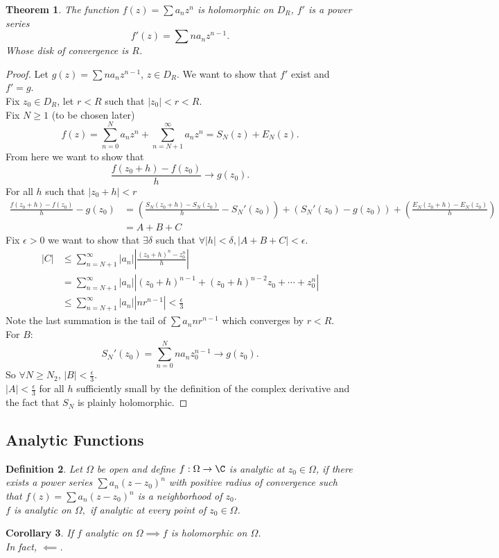 \documentclass[a4paper]{article}
\newtheorem{thm}{Theorem}[section]
\newtheorem{defn}[thm]{Definition}
\newtheorem{cor}[thm]{Corollary}
\begin{document}
\begin{thm}
    The function $f(z)=\sum a_nz^n$ is holomorphic on $D_R$, $f'$ is a power series 
    \[
    f'(z)=\sum na_nz^{n-1}
    .\] 
    Whose disk of convergence is $R$. 
\end{thm}
\begin{proof}
    Let $g(z)=\sum na_nz^{n-1}$, $z\in D_R$. We want to show that $f'$ exist and $f'=g$.\\
    Fix $z_0\in D_R$, let $r<R$ such that $|z_0|<r<R$.\\
    Fix $N\geq 1$ (to be chosen later)\\
    \[
    f(z)=\sum_{n=0}^{N} a_nz^n+\sum_{n=N+1}^\infty a_nz^n=S_N(z)+E_N(z)
    .\] 
    From here we want to show that \[
    \frac{f(z_0+h)-f(z_0)}{h}\to g(z_0)
    .\] 
    For all $h$ such that $|z_0+h|<r$
    \begin{align*}
            \frac{f(z_0+h)-f(z_0)}{h}-g(z_0)&= \left ( \frac{S_N(z_0+h)-S_N(z_0)}{h}-S_N'(z_0)\right ) + \left( S_N'(z_0)-g(z_0) \right) + \left( \frac{E_N(z_0+h)-E_N(z_0)}{h} \right)\\
            &= A + B + C
    \end{align*}
    Fix $\epsilon>0$ we want to show that $\exists \delta$ such that $\forall |h|<\delta, |A+B+C|<\epsilon.$
    \begin{align*}
            |C|&\leq \sum_{n=N+1}^\infty |a_n| \left | \frac{(z_0+h)^n-z_0^n}{h} \right |\\
            &=\sum_{n=N+1}^\infty |a_n| \left | (z_0+h)^{n-1}+(z_0+h)^{n-2}z_0+\cdots+z_0^n\right |\\
            &\leq \sum_{n=N+1}^\infty |a_n||nr^{n-1}| < \frac{\epsilon}{3} \tag{for all $N\geq N_1(\epsilon)$}
    \end{align*}
    Note the last summation is the tail of $\sum a_n    nr^{n-1}$ which converges by $r<R$.\\
    For $B$: \[
    S_N'(z_0)=\sum_{n=0}^Nna_nz_0^{n-1}\to g(z_0) \tag{by def of $g$}
    .\]
    So $\forall N\geq N_2$, $|B|<\frac{\epsilon}{3}$.\\
    $|A|<\frac{\epsilon}{3}$ for all $h$ sufficiently small by the definition of the complex derivative and the fact that $S_N$ is plainly holomorphic. 
\end{proof}
\subsection{Analytic Functions}
\begin{defn}
    Let $\Omega$ be open and define $f:\Omega\to \C$ is analytic at $z_0\in \Omega$, if there exists a power series $\sum a_n(z-z_0)^n$ with positive radius of convergence such that $f(z)=\sum a_n (z-z_0)^n$ is a neighborhood of $z_0.$ \\
    $f$ is analytic on $\Omega,$ if analytic at every point of $z_0\in \Omega$.  
\end{defn}
\begin{cor}
     If $f$ analytic on $\Omega\implies f$ is holomorphic on $\Omega$. \\
     In fact, $\impliedby$. 
\end{cor}
\newpage
\end{document}
